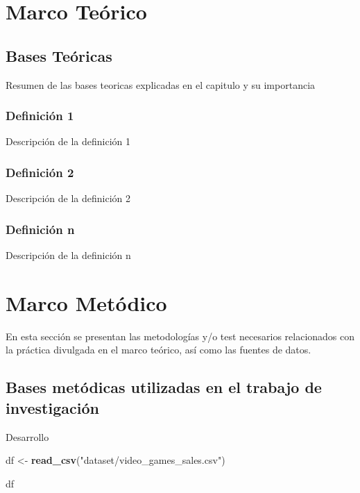 \documentclass[oneside,11pt]{Latex/Classes/PhDthesisPSnPDF}
\newenvironment{Shaded}{\begin{snugshade}}{\end{snugshade}}
\newcommand{\FunctionTok}[1]{\textcolor[rgb]{0.13,0.29,0.53}{\textbf{#1}}}
\newcommand{\NormalTok}[1]{#1}
\newcommand{\OtherTok}[1]{\textcolor[rgb]{0.56,0.35,0.01}{#1}}
\newcommand{\StringTok}[1]{\textcolor[rgb]{0.31,0.60,0.02}{#1}}
\begin{document}
\chapter{Marco Teórico}

\section{Bases Teóricas}

Resumen de las bases teoricas explicadas en el capitulo y su
importancia\\

\subsection{Definición 1}

Descripción de la definición 1\\

\subsection{Definición 2}

Descripción de la definición 2\\

\subsection{Definición n}

Descripción de la definición n\\

\chapter{Marco Metódico}

En esta sección se presentan las metodologías y/o test necesarios
relacionados con la práctica divulgada en el marco teórico, así como las
fuentes de datos.

\section{Bases metódicas utilizadas en el trabajo de investigación}

Desarrollo\\

\begin{Shaded}
\begin{Highlighting}[]
\NormalTok{df }\OtherTok{\textless{}{-}} \FunctionTok{read\_csv}\NormalTok{(}\StringTok{"dataset/video\_games\_sales.csv"}\NormalTok{)}

\NormalTok{df}
\end{Highlighting}
\end{Shaded}
\end{document}
